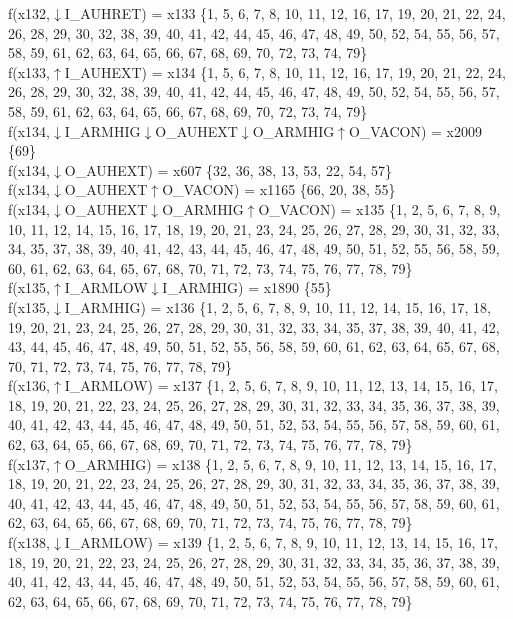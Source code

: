 f(x132,$\downarrow$I\_AUHRET) = x133 \{1, 5, 6, 7, 8, 10, 11, 12, 16, 17, 19, 20, 21, 22, 24, 26, 28, 29, 30, 32, 38, 39, 40, 41, 42, 44, 45, 46, 47, 48, 49, 50, 52, 54, 55, 56, 57, 58, 59, 61, 62, 63, 64, 65, 66, 67, 68, 69, 70, 72, 73, 74, 79\} \\  
f(x133,$\uparrow$I\_AUHEXT) = x134 \{1, 5, 6, 7, 8, 10, 11, 12, 16, 17, 19, 20, 21, 22, 24, 26, 28, 29, 30, 32, 38, 39, 40, 41, 42, 44, 45, 46, 47, 48, 49, 50, 52, 54, 55, 56, 57, 58, 59, 61, 62, 63, 64, 65, 66, 67, 68, 69, 70, 72, 73, 74, 79\} \\  
f(x134,$\downarrow$I\_ARMHIG$\downarrow$O\_AUHEXT$\downarrow$O\_ARMHIG$\uparrow$O\_VACON) = x2009 \{69\} \\  
f(x134,$\downarrow$O\_AUHEXT) = x607 \{32, 36, 38, 13, 53, 22, 54, 57\} \\  
f(x134,$\downarrow$O\_AUHEXT$\uparrow$O\_VACON) = x1165 \{66, 20, 38, 55\} \\  
f(x134,$\downarrow$O\_AUHEXT$\downarrow$O\_ARMHIG$\uparrow$O\_VACON) = x135 \{1, 2, 5, 6, 7, 8, 9, 10, 11, 12, 14, 15, 16, 17, 18, 19, 20, 21, 23, 24, 25, 26, 27, 28, 29, 30, 31, 32, 33, 34, 35, 37, 38, 39, 40, 41, 42, 43, 44, 45, 46, 47, 48, 49, 50, 51, 52, 55, 56, 58, 59, 60, 61, 62, 63, 64, 65, 67, 68, 70, 71, 72, 73, 74, 75, 76, 77, 78, 79\} \\  
f(x135,$\uparrow$I\_ARMLOW$\downarrow$I\_ARMHIG) = x1890 \{55\} \\  
f(x135,$\downarrow$I\_ARMHIG) = x136 \{1, 2, 5, 6, 7, 8, 9, 10, 11, 12, 14, 15, 16, 17, 18, 19, 20, 21, 23, 24, 25, 26, 27, 28, 29, 30, 31, 32, 33, 34, 35, 37, 38, 39, 40, 41, 42, 43, 44, 45, 46, 47, 48, 49, 50, 51, 52, 55, 56, 58, 59, 60, 61, 62, 63, 64, 65, 67, 68, 70, 71, 72, 73, 74, 75, 76, 77, 78, 79\} \\  
f(x136,$\uparrow$I\_ARMLOW) = x137 \{1, 2, 5, 6, 7, 8, 9, 10, 11, 12, 13, 14, 15, 16, 17, 18, 19, 20, 21, 22, 23, 24, 25, 26, 27, 28, 29, 30, 31, 32, 33, 34, 35, 36, 37, 38, 39, 40, 41, 42, 43, 44, 45, 46, 47, 48, 49, 50, 51, 52, 53, 54, 55, 56, 57, 58, 59, 60, 61, 62, 63, 64, 65, 66, 67, 68, 69, 70, 71, 72, 73, 74, 75, 76, 77, 78, 79\} \\  
f(x137,$\uparrow$O\_ARMHIG) = x138 \{1, 2, 5, 6, 7, 8, 9, 10, 11, 12, 13, 14, 15, 16, 17, 18, 19, 20, 21, 22, 23, 24, 25, 26, 27, 28, 29, 30, 31, 32, 33, 34, 35, 36, 37, 38, 39, 40, 41, 42, 43, 44, 45, 46, 47, 48, 49, 50, 51, 52, 53, 54, 55, 56, 57, 58, 59, 60, 61, 62, 63, 64, 65, 66, 67, 68, 69, 70, 71, 72, 73, 74, 75, 76, 77, 78, 79\} \\  
f(x138,$\downarrow$I\_ARMLOW) = x139 \{1, 2, 5, 6, 7, 8, 9, 10, 11, 12, 13, 14, 15, 16, 17, 18, 19, 20, 21, 22, 23, 24, 25, 26, 27, 28, 29, 30, 31, 32, 33, 34, 35, 36, 37, 38, 39, 40, 41, 42, 43, 44, 45, 46, 47, 48, 49, 50, 51, 52, 53, 54, 55, 56, 57, 58, 59, 60, 61, 62, 63, 64, 65, 66, 67, 68, 69, 70, 71, 72, 73, 74, 75, 76, 77, 78, 79\} \\  
